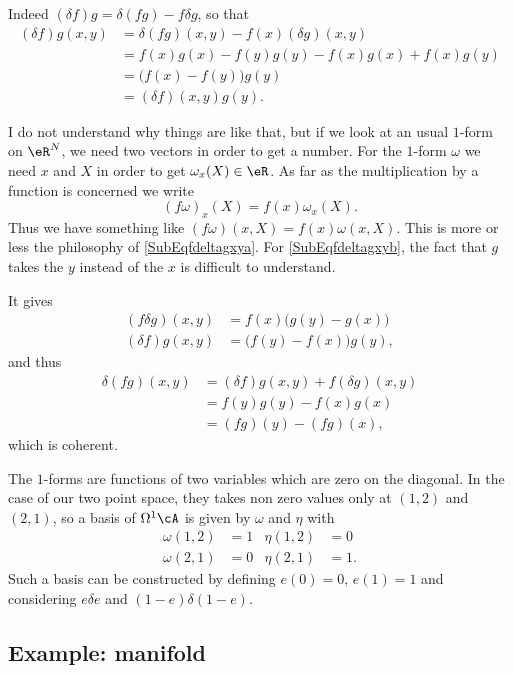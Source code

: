 Indeed $(\delta f)g=\delta(fg)-f\delta g$, so that
\begin{align*}
(\delta f)g(x,y)&=\delta(fg)(x,y)-f(x)(\delta g)(x,y)\\
		&=f(x)g(x)-f(y)g(y)-f(x)g(x)+f(x)g(y)\\
		&=\big( f(x)-f(y) \big)g(y)\\
		&=(\delta f)(x,y)g(y).
\end{align*}

\begin{probleme}
	I do not understand why things are like that, but if we look at an usual $1$-form on $\eR^N$, we need two vectors in order to get a number. For the $1$-form $\omega$ we need $x$ and $X$ in order to get $\omega_x(X)\in\eR$. As far as the multiplication by a function is concerned we write
\[ 
  (f\omega)_{x}(X)=f(x)\omega_{x}(X).
\]
Thus we have something like $(f\omega)(x,X)=f(x)\omega(x,X)$. This is more or less the philosophy of \eqref{SubEqfdeltagxya}. For \eqref{SubEqfdeltagxyb}, the fact that $g$ takes the $y$ instead of the $x$ is difficult to understand.
\end{probleme}
It gives 
\begin{subequations}
\begin{align}
  (f\delta g)(x,y)&=f(x)\big( g(y)-g(x) \big)\\
 (\delta f)g(x,y)&=\big( f(y)-f(x) \big)g(y),
\end{align}
\end{subequations}
and thus
\begin{align*}
\delta(fg)(x,y)&=(\delta f)g(x,y)+f(\delta g)(x,y)\\
		&=f(y)g(y)-f(x)g(x)\\
		&=(fg)(y)-(fg)(x),
\end{align*}
which is coherent.

The $1$-forms are functions of two variables which are zero on the diagonal. In the case of our two point space, they takes non zero values only at $(1,2)$ and $(2,1)$, so a basis of $\Omega^1\cA$ is given by $\omega$ and $\eta$ with 
\begin{align}
\omega(1,2)&=1 &\eta(1,2)&=0\\
\omega(2,1)&=0 &\eta(2,1)&=1.
\end{align}
Such a basis can be constructed by defining $e(0)=0$, $e(1)=1$ and considering $e\delta e$ and $(1-e)\delta(1-e)$.

\subsection{Example: manifold}

